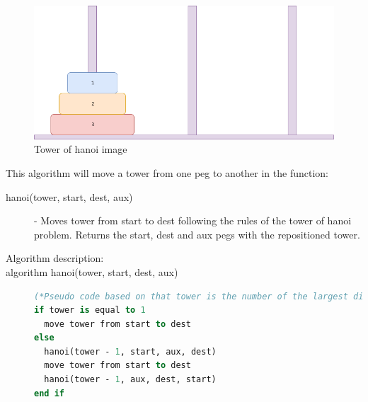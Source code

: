 \documentclass {article}
\begin{document}
\begin{figure}[H]
\includegraphics[width=\textwidth]{tower-of-hanoi-example}

\caption{Tower of hanoi image}
\label{fig:tower-of-hanoi-example}
\end{figure}

This algorithm will move a tower from one peg to another in the function:

\begin{description}
\item[hanoi(tower, start, dest, aux)] - Moves tower from start to dest following the rules of the tower of hanoi problem. Returns the start, dest and aux pegs with the repositioned tower.


\item[Algorithm description:]
\item[algorithm hanoi(tower, start, dest, aux)]
\item[] 
\begin{lstlisting}[language=Pascal]
(*Pseudo code based on that tower is the number of the largest disk, where 1 is the smallest disk in the tower.*)
if tower is equal to 1
  move tower from start to dest
else
  hanoi(tower - 1, start, aux, dest)
  move tower from start to dest
  hanoi(tower - 1, aux, dest, start)
end if
\end{lstlisting}
\end{description}
\end{document}
